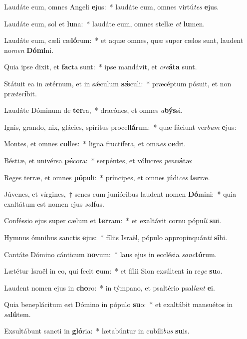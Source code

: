 \item Laudáte eum, omnes Angeli \textbf{e}jus:~* laudáte eum, omnes virtú\textit{tes} \textbf{e}jus.
\item Laudáte eum, sol et \textbf{lu}na:~* laudáte eum, omnes stellæ \textit{et} \textbf{lu}men.
\item Laudáte eum, cæli cæ\textbf{ló}rum:~* et aquæ omnes, quæ super cælos sunt, laudent no\textit{men} \textbf{Dó}\textbf{mi}ni.
\item Quia ipse dixit, et \textbf{fac}ta sunt:~* ipse mandávit, et \textit{cre}\textbf{á}\textbf{ta} sunt.
\item Státuit ea in ætérnum, et in sǽculum \textbf{sǽ}culi:~* præcéptum pósuit, et non præ\textit{ter}\textbf{í}bit.
\item Laudáte Dóminum de \textbf{ter}ra,~* dracónes, et omnes \textit{a}\textbf{býs}si.
\item Ignis, grando, nix, glácies, spíritus procel\textbf{lá}rum:~* quæ fáciunt ver\textit{bum} \textbf{e}jus:
\item Montes, et omnes \textbf{col}les:~* ligna fructífera, et om\textit{nes} \textbf{ce}dri.
\item Béstiæ, et univérsa \textbf{pé}cora:~* serpéntes, et vólucres \textit{pen}\textbf{ná}tæ:
\item Reges terræ, et omnes \textbf{pó}puli:~* príncipes, et omnes júdi\textit{ces} \textbf{ter}ræ.
\item Júvenes, et vírgines,~† senes cum junióribus laudent nomen \textbf{Dó}mini:~* quia exaltátum est nomen ejus \textit{so}\textbf{lí}us.
\item Conféssio ejus super cælum et \textbf{ter}ram:~* et exaltávit cornu pópu\textit{li} \textbf{su}i.
\item Hymnus ómnibus sanctis \textbf{e}jus:~* fíliis Israël, pópulo appropinquán\textit{ti} \textbf{si}bi.
\item Cantáte Dómino cánticum \textbf{no}vum:~* laus ejus in ecclésia \textit{sanc}\textbf{tó}rum.
\item Lætétur Israël in eo, qui fecit \textbf{e}um:~* et fílii Sion exsúltent in re\textit{ge} \textbf{su}o.
\item Laudent nomen ejus in \textbf{cho}ro:~* in týmpano, et psaltério psal\textit{lant} \textbf{e}i.
\item Quia beneplácitum est Dómino in pópulo \textbf{su}o:~* et exaltábit mansuétos in \textit{sa}\textbf{lú}tem.
\item Exsultábunt sancti in \textbf{gló}ria:~* lætabúntur in cubíli\textit{bus} \textbf{su}is.
